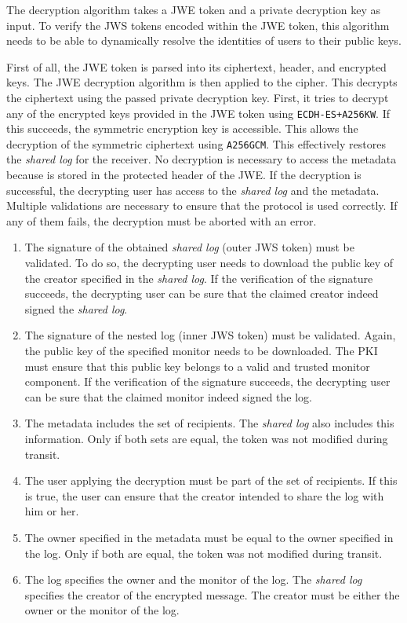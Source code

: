 \documentclass[../main.tex]{subfiles}
\begin{document}
\begin{itemize}
The decryption algorithm takes a JWE token and a private decryption key as input.
To verify the JWS tokens encoded within the JWE token, this algorithm needs to be able to dynamically resolve the identities of users to their public keys.

First of all, the JWE token is parsed into its ciphertext, header, and encrypted keys.
The JWE decryption algorithm is then applied to the cipher.
This decrypts the ciphertext using the passed private decryption key.
First, it tries to decrypt any of the encrypted keys provided in the JWE token using \verb|ECDH-ES+A256KW|.
If this succeeds, the symmetric encryption key is accessible.
This allows the decryption of the symmetric ciphertext using \verb|A256GCM|.
This effectively restores the \emph{shared log} for the receiver.
No decryption is necessary to access the metadata because is stored in the protected header of the JWE.
If the decryption is successful, the decrypting user has access to the \emph{shared log} and the metadata.
Multiple validations are necessary to ensure that the protocol is used correctly.
If any of them fails, the decryption must be aborted with an error.
\begin{enumerate}
    \item 
    The signature of the obtained \emph{shared log} (outer JWS token) must be validated.
    To do so, the decrypting user needs to download the public key of the creator specified in the \emph{shared log}.
    If the verification of the signature succeeds, the decrypting user can be sure that the claimed creator indeed signed the \emph{shared log}.
    \item
    The signature of the nested log (inner JWS token) must be validated.
    Again, the public key of the specified monitor needs to be downloaded.
    The PKI must ensure that this public key belongs to a valid and trusted monitor component.
    If the verification of the signature succeeds, the decrypting user can be sure that the claimed monitor indeed signed the log.
    \item
    The metadata includes the set of recipients.
    The \emph{shared log} also includes this information.
    Only if both sets are equal, the token was not modified during transit.
    \item
    The user applying the decryption must be part of the set of recipients.
    If this is true, the user can ensure that the creator intended to share the log with him or her.
    \item
    The owner specified in the metadata must be equal to the owner specified in the log.
    Only if both are equal, the token was not modified during transit.
    \item
    The log specifies the owner and the monitor of the log.
    The \emph{shared log} specifies the creator of the encrypted message.
    The creator must be either the owner or the monitor of the log.
    

\end{enumerate}
\end{itemize}
\end{document}
